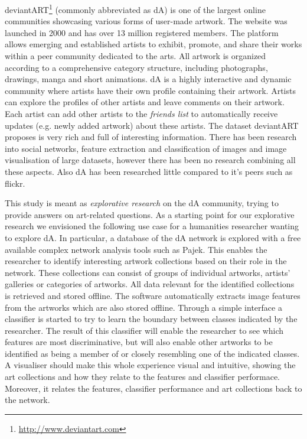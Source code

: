 deviantART\footnote{\url{http://www.deviantart.com}} (commonly abbreviated as dA) is one of the largest online communities showcasing various forms of user-made artwork.
The website was launched in 2000 and has over 13 million registered members.
The platform allows emerging and established artists to exhibit, promote, and share their works within a peer community dedicated to the arts. 
All artwork is organized according to a comprehensive category structure, including photographs, drawings, manga and short animations.
dA is a highly interactive and dynamic community where artists have their own profile containing their artwork.
Artists can explore the profiles of other artists and leave comments on their artwork.
Each artist can add other artists to the \textit{friends list} to automatically receive updates (e.g. newly added artwork) about these artists.
The dataset deviantART proposes is very rich and full of interesting information. There has been research into social networks, feature extraction and classification of images and image visualisation of large datasets, however there has been no research combining all these aspects. Also dA has been researched little compared to it's peers such as flickr.

This study is meant as \textit{explorative research} on the dA community, trying to provide answers on art-related questions.
As a starting point for our explorative research we envisioned the following use case for a humanities researcher wanting to explore dA. In particular, a database of the dA network is explored with a free available complex network analysis tools such as Pajek. This enables the researcher to identify interesting artwork collections based on their role in the network. These collections can consist of groups of individual artworks, artists' galleries or categories of artworks.  All data relevant for the identified collections is retrieved and stored offline. The software automatically extracts image features from the artworks which are also stored offline. Through a simple interface a classifier is started to try to learn the boundary between classes indicated by the researcher. The result of this classifier will enable the researcher to see which features are most discriminative, but will also enable other artworks to be identified as being a member of or closely resembling one of the indicated classes. A visualiser should make this whole experience visual and intuitive, showing the art collections and how they relate to the features and classifier performace. Moreover, it relates the features, classifier performance and art collections back to the network.

